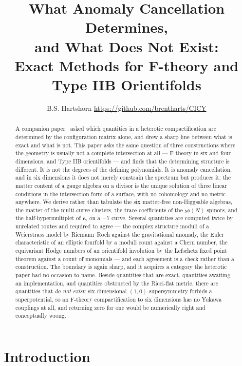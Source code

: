 \documentclass[11pt,a4paper]{article}
\title{\vspace{-1cm}\textbf{What Anomaly Cancellation Determines,\\
and What Does Not Exist:\\[2pt]
\large Exact Methods for F-theory and Type IIB Orientifolds}}
\author{B.S. Hartshorn \orcidlink{0009-0004-2853-655X} \small \url{https://github.com/brentharts/CICY}}
\newcommand{\g}[1]{\mathfrak{#1}}
\theoremstyle{definition}
\begin{document}
\maketitle

\begin{abstract}
A companion paper~\cite{SuppMath} asked which quantities in a heterotic
compactification are determined by the configuration matrix alone, and drew a
sharp line between what is exact and what is not. This paper asks the same
question of three constructions where the geometry is usually not a complete
intersection at all --- F-theory in six and four dimensions, and Type IIB
orientifolds --- and finds that the determining structure is different. It is
not the degrees of the defining polynomials. It is anomaly cancellation, and
in six dimensions it does not merely constrain the spectrum but produces it:
the matter content of a gauge algebra on a divisor is the unique solution of
three linear conditions in the intersection form of a surface, with no
cohomology and no metric anywhere. We derive rather than tabulate the six
matter-free non-Higgsable algebras, the matter of the multi-curve clusters,
the trace coefficients of the $\g{so}(N)$ spinors, and the
half-hypermultiplet of $\g{e}_7$ on a $-7$ curve. Several quantities are
computed twice by unrelated routes and required to agree --- the complex
structure moduli of a Weierstrass model by Riemann--Roch against the
gravitational anomaly, the Euler characteristic of an elliptic fourfold by a
moduli count against a Chern number, the equivariant Hodge numbers of an
orientifold involution by the Lefschetz fixed point theorem against a count
of monomials --- and each agreement is a check rather than a construction.
The boundary is again sharp, and it acquires a category the heterotic paper
had no occasion to name. Beside quantities that are exact, quantities awaiting
an implementation, and quantities obstructed by the Ricci-flat metric, there
are quantities that \emph{do not exist}: six-dimensional $(1,0)$ supersymmetry
forbids a superpotential, so an F-theory compactification to six dimensions
has no Yukawa couplings at all, and returning zero for one would be
numerically right and conceptually wrong.
\end{abstract}

\tableofcontents


\section{Introduction}
\label{sec:intro}
\end{document}
